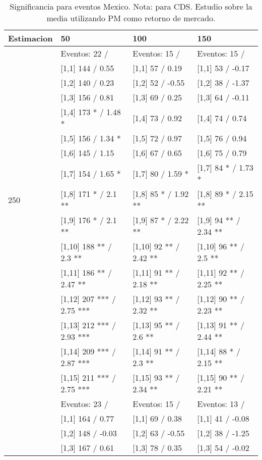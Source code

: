 \begin{table}

\caption{Significancia para eventos Mexico. Nota: para CDS. Estudio sobre la media utilizando PM como retorno de mercado.}
\centering
\begin{tabular}[t]{llll}
\toprule
Estimacion & 50 & 100 & 150\\
\midrule
 & Eventos:  22 / & Eventos:  15 / & Eventos:  15 /\\
 & {}[1,1] 144  / 0.55 & {}[1,1] 57  / 0.19 & {}[1,1] 53  / -0.17\\
 & {}[1,2] 140  / 0.23 & {}[1,2] 52  / -0.55 & {}[1,2] 38  / -1.37\\
 & {}[1,3] 156  / 0.81 & {}[1,3] 69  / 0.25 & {}[1,3] 64  / -0.11\\
 & {}[1,4] 173 * / 1.48 * & {}[1,4] 73  / 0.92 & {}[1,4] 74  / 0.74\\
\addlinespace
 & {}[1,5] 156  / 1.34 * & {}[1,5] 72  / 0.97 & {}[1,5] 76  / 0.94\\
 & {}[1,6] 145  / 1.15 & {}[1,6] 67  / 0.65 & {}[1,6] 75  / 0.79\\
 & {}[1,7] 154  / 1.65 * & {}[1,7] 80  / 1.59 * & {}[1,7] 84 * / 1.73 *\\
250 & {}[1,8] 171 * / 2.1 ** & {}[1,8] 85 * / 1.92 ** & {}[1,8] 89 * / 2.15 **\\
 & {}[1,9] 176 * / 2.1 ** & {}[1,9] 87 * / 2.22 ** & {}[1,9] 94 ** / 2.34 **\\
\addlinespace
 & {}[1,10] 188 ** / 2.3 ** & {}[1,10] 92 ** / 2.42 ** & {}[1,10] 96 ** / 2.5 **\\
 & {}[1,11] 186 ** / 2.47 ** & {}[1,11] 91 ** / 2.18 ** & {}[1,11] 92 ** / 2.25 **\\
 & {}[1,12] 207 *** / 2.75 *** & {}[1,12] 93 ** / 2.32 ** & {}[1,12] 90 ** / 2.23 **\\
 & {}[1,13] 212 *** / 2.93 *** & {}[1,13] 95 ** / 2.6 ** & {}[1,13] 91 ** / 2.44 **\\
 & {}[1,14] 209 *** / 2.87 *** & {}[1,14] 91 ** / 2.3 ** & {}[1,14] 88 * / 2.15 **\\
\addlinespace
 & {}[1,15] 211 *** / 2.75 *** & {}[1,15] 93 ** / 2.34 ** & {}[1,15] 90 ** / 2.21 **\\
 & Eventos:  23 / & Eventos:  15 / & Eventos:  13 /\\
 & {}[1,1] 164  / 0.77 & {}[1,1] 69  / 0.38 & {}[1,1] 41  / -0.08\\
 & {}[1,2] 148  / -0.03 & {}[1,2] 63  / -0.55 & {}[1,2] 38  / -1.25\\
 & {}[1,3] 167  / 0.61 & {}[1,3] 78  / 0.35 & {}[1,3] 54  / -0.02\\

\end{tabular}
\end{table}
